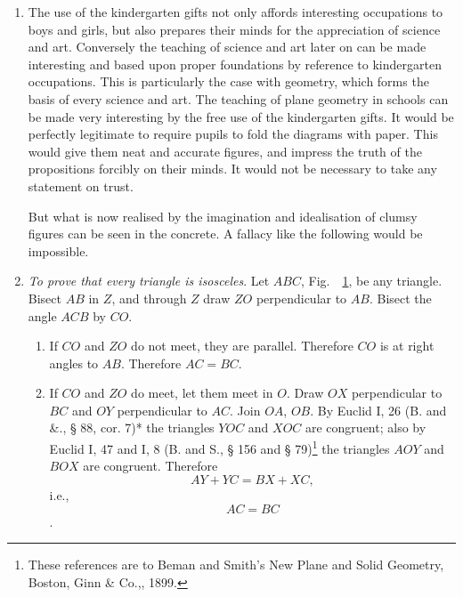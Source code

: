 \begin{enumerate}
    \item The use of the kindergarten gifts not only affords interesting
        occupations to boys and girls, but also prepares their minds for the
        appreciation of science and art. Conversely the teaching of science and
        art later on can be made interesting and based upon proper foundations
        by reference to kindergarten occupations. This is particularly the case
        with geometry, which forms the basis of every science and art. The
        teaching of plane geometry in schools can be made very interesting by
        the free use of the kindergarten gifts. It would be perfectly legitimate
        to require pupils to fold the diagrams with paper. This would give them
        neat and accurate figures, and impress the truth of the propositions
        forcibly on their minds. It would not be necessary to take any statement
        on trust.

        But what is now realised by the imagination and idealisation of clumsy
        figures can be seen in the concrete.  A fallacy like the following would
        be impossible.

    \item \emph{To prove that every triangle is isosceles}. Let $ABC$,
        Fig.\ ~\ref{fig:isosceles_intro}, be any triangle.  Bisect $AB$ in $Z$,
        and through $Z$ draw $ZO$ perpendicular to $AB$.  Bisect the angle $ACB$
        by $CO$.

        \begin{figure}
            \begin{center}
                
            \end{center}
            \label{fig:isosceles_intro}
        \end{figure}


        \begin{enumerate}[(1)]

            \item If $CO$ and $ZO$ do not meet, they are parallel. Therefore
                $CO$ is at right angles to $AB$. Therefore $AC = BC$.

            \item If $CO$ and $ZO$ do meet, let them meet in $O$.  Draw $OX$
                perpendicular to $BC$ and $OY$ perpendicular to $AC$. Join $OA$,
                $OB$.  By Euclid I, 26 (B. and \&., § 88, cor. 7)* the triangles
                $YOC$ and $XOC$ are congruent; also by Euclid I, 47 and I, 8 (B.
                and S., § 156 and § 79)\footnote{These references are to Beman
                and Smith's New Plane and Solid Geometry, Boston, Ginn & Co.,,
                1899.} the triangles $AOY$ and $BOX$ are congruent.  Therefore
                $$AY + YC = BX + XC,$$ i.e., $$AC = BC$$.



\end{enumerate}
\end{enumerate}
